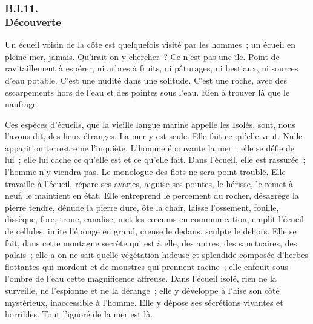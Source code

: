 \documentclass[french,twoside]{book} %
\begin{document}
 \subsubsection[{B.I.11. Découverte}]{B.I.11. \\
Découverte}
\noindent Un écueil voisin de la côte est quelquefois visité par les hommes ; un écueil en pleine mer, jamais. Qu’irait-on y chercher ? Ce n’est pas une île. Point de ravitaillement à espérer, ni arbres à fruits, ni pâturages, ni bestiaux, ni sources d’eau potable. C’est une nudité dans une solitude. C’est une roche, avec des escarpements hors de l’eau et des pointes sous l’eau. Rien à trouver là que le naufrage.\par
Ces espèces d’écueils, que la vieille langue marine appelle les Isolés, sont, nous l’avons dit, des lieux étranges. La mer y est seule. Elle fait ce qu’elle veut. Nulle apparition terrestre ne l’inquiète. L’homme épouvante la mer ; elle se défie de lui ; elle lui cache ce qu’elle est et ce qu’elle fait. Dans l’écueil, elle est rassurée ; l’homme n’y viendra pas. Le monologue des flots ne sera point troublé. Elle travaille à l’écueil, répare ses avaries, aiguise ses pointes, le hérisse, le remet à neuf, le maintient en état. Elle entreprend le  percement du rocher, désagrége la pierre tendre, dénude la pierre dure, ôte la chair, laisse l’ossement, fouille, dissèque, fore, troue, canalise, met les cœcums en communication, emplit l’écueil de cellules, imite l’éponge en grand, creuse le dedans, sculpte le dehors. Elle se fait, dans cette montagne secrète qui est à elle, des antres, des sanctuaires, des palais ; elle a on ne sait quelle végétation hideuse et splendide composée d’herbes flottantes qui mordent et de monstres qui prennent racine ; elle enfouit sous l’ombre de l’eau cette magnificence affreuse. Dans l’écueil isolé, rien ne la surveille, ne l’espionne et ne la dérange ; elle y développe à l’aise son côté mystérieux, inaccessible à l’homme. Elle y dépose ses sécrétions vivantes et horribles. Tout l’ignoré de la mer est là.\par
\end{document}
